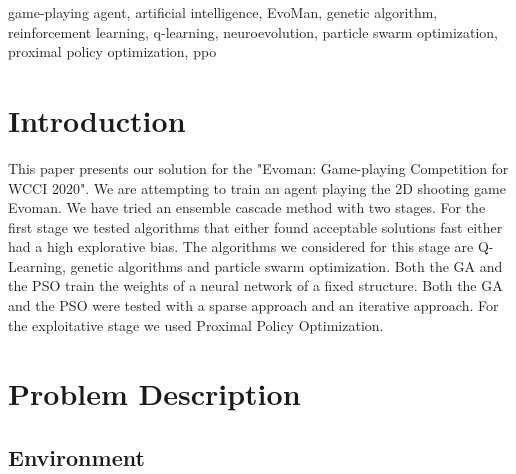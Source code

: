 \documentclass[conference]{IEEEtran}
\begin{document}
    \begin{IEEEkeywords}
        game-playing agent, artificial intelligence, EvoMan, genetic algorithm, reinforcement learning,
        q-learning, neuroevolution, particle swarm optimization, proximal policy optimization, ppo
    \end{IEEEkeywords}


    \section{Introduction}\label{sec:introduction}
    This paper presents our solution for the "Evoman: Game-playing Competition for WCCI 2020"\cite{evoman_competition}.
    We are attempting to train an agent playing the 2D shooting game Evoman\cite{evoman}.
    We have tried an ensemble cascade method with two stages.
    For the first stage we tested algorithms that either found acceptable solutions fast either had a high
    explorative bias.
    The algorithms we considered for this stage are Q-Learning\cite{q_learning}, genetic algorithms\cite{genetic_algorithm}
    and particle swarm optimization\cite{pso}.
    Both the GA and the PSO train the weights of a neural network of a fixed structure.
    Both the GA and the PSO were tested with a sparse approach and an iterative approach.
    For the exploitative stage we used Proximal Policy Optimization\cite{ppo}.

    \section{Problem Description}\label{sec:problem-description}

    \subsection{Environment}\label{subsec:environment}
\end{document}
